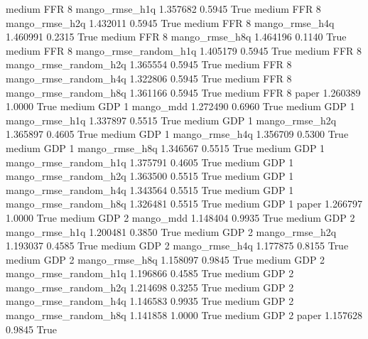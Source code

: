     medium      FFR                 8        mango_rmse_h1q   1.357682      0.5945    True
    medium      FFR                 8        mango_rmse_h2q   1.432011      0.5945    True
    medium      FFR                 8        mango_rmse_h4q   1.460991      0.2315    True
    medium      FFR                 8        mango_rmse_h8q   1.464196      0.1140    True
    medium      FFR                 8 mango_rmse_random_h1q   1.405179      0.5945    True
    medium      FFR                 8 mango_rmse_random_h2q   1.365554      0.5945    True
    medium      FFR                 8 mango_rmse_random_h4q   1.322806      0.5945    True
    medium      FFR                 8 mango_rmse_random_h8q   1.361166      0.5945    True
    medium      FFR                 8                 paper   1.260389      1.0000    True
    medium      GDP                 1             mango_mdd   1.272490      0.6960    True
    medium      GDP                 1        mango_rmse_h1q   1.337897      0.5515    True
    medium      GDP                 1        mango_rmse_h2q   1.365897      0.4605    True
    medium      GDP                 1        mango_rmse_h4q   1.356709      0.5300    True
    medium      GDP                 1        mango_rmse_h8q   1.346567      0.5515    True
    medium      GDP                 1 mango_rmse_random_h1q   1.375791      0.4605    True
    medium      GDP                 1 mango_rmse_random_h2q   1.363500      0.5515    True
    medium      GDP                 1 mango_rmse_random_h4q   1.343564      0.5515    True
    medium      GDP                 1 mango_rmse_random_h8q   1.326481      0.5515    True
    medium      GDP                 1                 paper   1.266797      1.0000    True
    medium      GDP                 2             mango_mdd   1.148404      0.9935    True
    medium      GDP                 2        mango_rmse_h1q   1.200481      0.3850    True
    medium      GDP                 2        mango_rmse_h2q   1.193037      0.4585    True
    medium      GDP                 2        mango_rmse_h4q   1.177875      0.8155    True
    medium      GDP                 2        mango_rmse_h8q   1.158097      0.9845    True
    medium      GDP                 2 mango_rmse_random_h1q   1.196866      0.4585    True
    medium      GDP                 2 mango_rmse_random_h2q   1.214698      0.3255    True
    medium      GDP                 2 mango_rmse_random_h4q   1.146583      0.9935    True
    medium      GDP                 2 mango_rmse_random_h8q   1.141858      1.0000    True
    medium      GDP                 2                 paper   1.157628      0.9845    True
